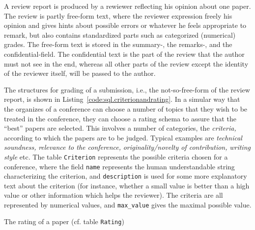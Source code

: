 
A review report is produced by a rewiewer reflecting his opinion about one
paper. The review is partly free-form text, where the reviewer expression
freely his opinion and gives hints about possible errors or whatever he feels
appropriate to remark, but also contains standardized parts such as
categorized (numerical) grades. The free-form text is stored in the summary-,
the remarks-, and the confidential-field. The confidential text is the part of
the review that the author must not see in the end, whereas all other parts of
the review except the identity of the reviewer itself, will be passed to the
author. 


%



The structures for grading of a submission, i.e., the not-so-free-form of
the review report, is shown in Listing~\ref{code:sql.criterionandrating}.
In a simular way that the organizes of a conference can choose a number of
topics that they wish to be treated in the conference, they can choose a
rating schema to assure that the ``best'' papers are selected.
%
This involves a number of categories, the \emph{criteria,} according to
which the papers are to be judged. Typical examples are \emph{technical
  soundness,} \emph{relevance to the conference,} \emph{originality/novelty
  of contribution,} \emph{writing style} etc. The table \texttt{Criterion}
represents the possible criteria chosen for a conference, where the field
\texttt{name} represents the human understandable string characterizing the
criterion, and \texttt{description} is used for some more explanatory text
about the criterion (for instance, whether a small value is better than a
high value or other information which helps the reviewer). The criteria are
all represented by numerical values, and \texttt{max\_value} gives the
maximal possible value.

The rating of a paper (cf. table \texttt{Rating})


 
%





%



%

